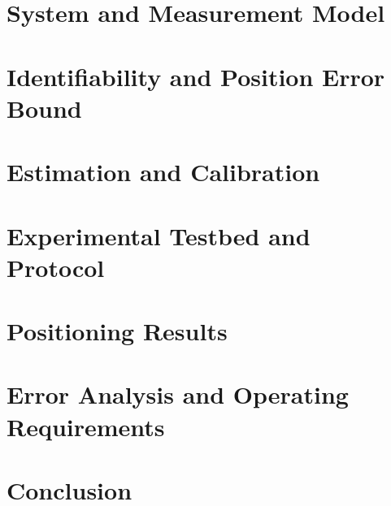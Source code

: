 \documentclass[journal]{IEEEtran}
\begin{document}
\section{System and Measurement Model}
\label{sec:model}


\section{Identifiability and Position Error Bound}
\label{sec:bounds}


\section{Estimation and Calibration}
\label{sec:estimation}


\section{Experimental Testbed and Protocol}
\label{sec:testbed}


\section{Positioning Results}
\label{sec:results}


\section[Error Analysis and Operating Requirements]{Error Analysis and Operating Requirements}
\label{sec:analysis}



\section{Conclusion}
\label{sec:conclusion}


\appendices






\end{document}
